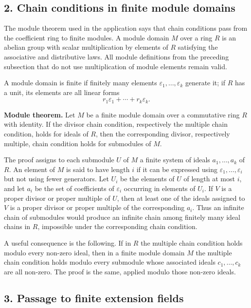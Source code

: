 \documentclass[12pt]{article}
\begin{document}
\subsection{2. Chain conditions in finite module domains}

The module theorem used in the application says that chain conditions pass from the coefficient ring to finite modules. A module domain $M$ over a ring $R$ is an abelian group with scalar multiplication by elements of $R$ satisfying the associative and distributive laws. All module definitions from the preceding subsection that do not use multiplication of module elements remain valid.

A module domain is finite if finitely many elements $\varepsilon_1,\ldots,\varepsilon_k$ generate it; if $R$ has a unit, its elements are all linear forms
\[
  r_1\varepsilon_1+\cdots+r_k\varepsilon_k.
\]

\textbf{Module theorem.} Let $M$ be a finite module domain over a commutative ring $R$ with identity. If the divisor chain condition, respectively the multiple chain condition, holds for ideals of $R$, then the corresponding divisor, respectively multiple, chain condition holds for submodules of $M$.

The proof assigns to each submodule $U$ of $M$ a finite system of ideals $a_1,\ldots,a_k$ of $R$. An element of $M$ is said to have length $i$ if it can be expressed using $\varepsilon_1,
\ldots,\varepsilon_i$ but not using fewer generators. Let $U_i$ be the elements of $U$ of length at most $i$, and let $a_i$ be the set of coefficients of $\varepsilon_i$ occurring in elements of $U_i$. If $V$ is a proper divisor or proper multiple of $U$, then at least one of the ideals assigned to $V$ is a proper divisor or proper multiple of the corresponding $a_i$. Thus an infinite chain of submodules would produce an infinite chain among finitely many ideal chains in $R$, impossible under the corresponding chain condition.

A useful consequence is the following. If in $R$ the multiple chain condition holds modulo every non-zero ideal, then in a finite module domain $M$ the multiple chain condition holds modulo every submodule whose associated ideals $c_1,\ldots,c_k$ are all non-zero. The proof is the same, applied modulo those non-zero ideals.

\subsection{3. Passage to finite extension fields}
\end{document}
